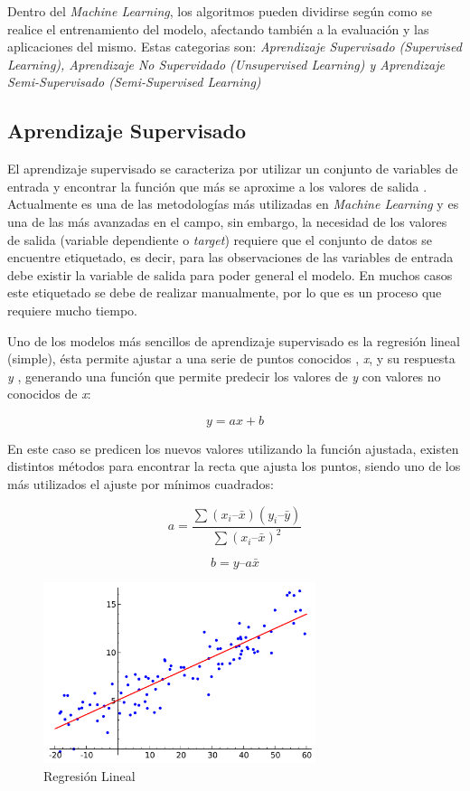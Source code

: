 Dentro del \textit{Machine Learning}, los algoritmos pueden dividirse según como se realice el entrenamiento del modelo, afectando también a la evaluación y las aplicaciones del mismo. Estas categorias son: \textit{Aprendizaje Supervisado (Supervised Learning), Aprendizaje No Supervidado (Unsupervised Learning) y Aprendizaje Semi-Supervisado (Semi-Supervised Learning)}

\subsection{Aprendizaje Supervisado}

El aprendizaje supervisado se caracteriza por utilizar un conjunto de variables de entrada y encontrar la función que más se aproxime a los valores de salida \cite{Liu2012}. Actualmente es una de las metodologías más utilizadas en \textit{Machine Learning} y es una de las más avanzadas en el campo, sin embargo, la necesidad de los valores de salida (variable dependiente o \textit{target}) requiere que el conjunto de datos se encuentre etiquetado, es decir, para las observaciones de las variables de entrada debe existir la variable de salida para poder general el modelo. En muchos casos este etiquetado se debe de realizar manualmente, por lo que es un proceso que requiere mucho tiempo.

Uno de los modelos más sencillos de aprendizaje supervisado es la regresión lineal (simple), ésta permite ajustar a una serie de puntos conocidos , \textit{x}, y su respuesta \textit{y} \cite{james2013introduction}, generando una función que permite predecir los valores de \textit{y} con valores no conocidos de \textit{x}:

\begin{equation}
y = ax + b 
\end{equation}

En este caso se predicen los nuevos valores utilizando la función ajustada, existen distintos métodos para encontrar la recta que ajusta los puntos, siendo uno de los más utilizados el ajuste por mínimos cuadrados:

\begin{equation}
a = \frac{\sum(x_i – \bar{x}) (y_i – \bar{y})} {\sum(x_i – \bar{x})^2}
\end{equation}

\begin{equation}
b = y – a \bar{x}
\end{equation}

\begin{figure}[H]
	\centering
	\includegraphics[width=8cm]{figs/Linear_regression.png}
	\caption{Regresión Lineal}
	\label{fig:reglin}
\end{figure}


